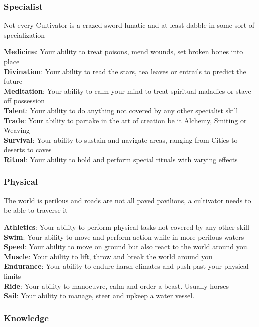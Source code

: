 \subsubsection{Specialist}

Not every Cultivator is a crazed sword lunatic and at least dabble in some sort of specialization

\textbf{Medicine}: Your ability to treat poisons, mend wounds, set broken bones into place\\
\textbf{Divination}: Your ability to read the stars, tea leaves or entrails to predict the future\\
\textbf{Meditation}: Your ability to calm your mind to treat spiritual maladies or stave off possession \\
\textbf{Talent}: Your ability to do anything not covered by any other specialist skill\\
\textbf{Trade}: Your ability to partake in the art of creation be it Alchemy, Smiting or Weaving\\
\textbf{Survival}: Your ability to sustain and navigate areas, ranging from Cities to deserts to caves\\
\textbf{Ritual}: Your ability to hold and perform special rituals with varying effects 

\subsubsection{Physical}

The world is perilous and roads are not all paved pavilions, a cultivator needs to be able to traverse it

\textbf{Athletics}: Your ability to perform physical tasks not covered by any other skill\\
\textbf{Swim}: Your ability to move and perform action while in more perilous waters\\
\textbf{Speed}: Your ability to move on ground but also react to the world around you.\\
\textbf{Muscle}: Your ability to lift, throw and break the world around you \\
\textbf{Endurance}: Your ability to endure harsh climates and push past your physical limits \\
\textbf{Ride}: Your ability to manoeuvre, calm and order a beast. Usually horses \\
\textbf{Sail}: Your ability to manage, steer and upkeep a water vessel.

\subsubsection{Knowledge}

